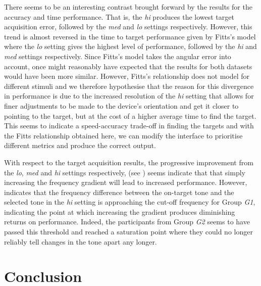 \documentclass[]{interact}
\begin{document}
There seems to be an interesting contrast brought forward by the results for the accuracy and time performance.
That is, the \textit{hi} produces the lowest target acquisition error, followed by the \textit{med} and \textit{lo} settings respectively. 
However, this trend is almost reversed in the time to target performance given by Fitts's model where the \textit{lo} setting gives the highest level of performance, followed by the \textit{hi} and \textit{med} settings respectively. 
Since Fitts's model takes the angular error into account, once might reasonably have expected that the results for both datasets would have been more similar. 
However, Fitts's relationship does not model for different stimuli and we therefore hypothesise that the reason for this divergence in performance is due to the increased resolution of the \textit{hi} setting that allows for finer adjustments to be made to the device's orientation and get it closer to pointing to the target, but at the cost of a higher average time to find the target. 
This seems to indicate a speed-accuracy trade-off in finding the targets and with the Fitts relationship obtained here, we can modify the interface to prioritise different metrics and produce the correct output.

With respect to the target acquisition results, the progressive improvement from the \textit{lo}, \textit{med} and \textit{hi} settings respectively, (see ) seems indicate that that simply increasing the frequency gradient will lead to increased performance.
However,  indicates that the frequency difference between the on-target tone and the selected tone in the \textit{hi} setting is approaching the cut-off frequency for Group \textit{G1}, indicating the point at which increasing the gradient produces diminishing returns on performance. 
Indeed, the participants from Group \textit{G2} seems to have passed this threshold and reached a saturation point where they could no longer reliably tell changes in the tone apart any longer. 

\section{Conclusion}\label{sec:conclusion}
\end{document}
